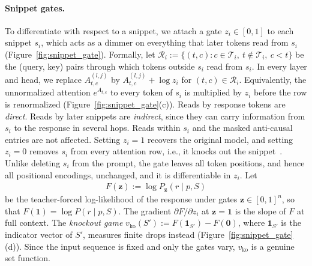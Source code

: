 \documentclass{article}
\begin{document}
\paragraph{Snippet gates.}
To differentiate with respect to a snippet, we attach a gate $z_i \in [0,1]$ to each snippet $s_i$, which acts as a dimmer on everything that later tokens read from $s_i$ (Figure~\ref{fig:snippet_gate}). Formally, let $\mathcal{R}_i := \{(t,c) : c \in \mathcal{T}_i,\ t \notin \mathcal{T}_i,\ c < t\}$ be the (query, key) pairs through which tokens outside $s_i$ read from $s_i$. In every layer and head, we replace $A^{(l,j)}_{t,c}$ by $A^{(l,j)}_{t,c} + \log z_i$ for $(t,c) \in \mathcal{R}_i$. Equivalently, the unnormalized attention $e^{A_{t,c}}$ to every token of $s_i$ is multiplied by $z_i$ before the row is renormalized (Figure~\ref{fig:snippet_gate}(c)). Reads by response tokens are \emph{direct}. Reads by later snippets are \emph{indirect}, since they can carry information from $s_i$ to the response in several hops. Reads within $s_i$ and the masked anti-causal entries are not affected. Setting $z_i = 1$ recovers the original model, and setting $z_i = 0$ removes $s_i$ from every attention row, i.e., it knocks out the snippet~\cite{geva2023dissecting}. Unlike deleting $s_i$ from the prompt, the gate leaves all token positions, and hence all positional encodings, unchanged, and it is differentiable in $z_i$. Let
\begin{align}
    F(\mathbf{z}) := \log P_{\mathbf{z}}(r \mid p, S)
\end{align}
be the teacher-forced log-likelihood of the response under gates $\mathbf{z} \in [0,1]^n$, so that $F(\mathbf{1}) = \log P(r \mid p, S)$. The gradient $\partial F / \partial z_i$ at $\mathbf{z} = \mathbf{1}$ is the slope of $F$ at full context. The \emph{knockout game} $v_{\text{ko}}(S') := F(\mathbf{1}_{S'}) - F(\mathbf{0})$, where $\mathbf{1}_{S'}$ is the indicator vector of $S'$, measures finite drops instead (Figure~\ref{fig:snippet_gate}(d)). Since the input sequence is fixed and only the gates vary, $v_{\text{ko}}$ is a genuine set function.
\end{document}
